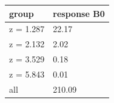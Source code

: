 \begingroup\small
\setlength{\tabcolsep}{3pt}
\renewcommand{\arraystretch}{1.04}
\begin{tabularx}{\linewidth}{XX}
\toprule
group & response B0 \\
\midrule
z = 1.287 & 22.17 \\
z = 2.132 & 2.02 \\
z = 3.529 & 0.18 \\
z = 5.843 & 0.01 \\
all & 210.09 \\
\bottomrule
\end{tabularx}
\endgroup
